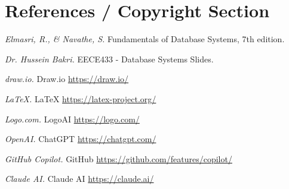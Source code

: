 \section{References / Copyright Section}

\begin{thebibliography}{9}
  \textit{Elmasri, R., \& Navathe, S.} Fundamentals of Database Systems, 7th edition.
  
  \textit{Dr. Hussein Bakri.} EECE433 - Database Systems Slides.
  
  \textit{draw.io.} Draw.io
  \url{https://draw.io/}
  
  \textit{LaTeX.} LaTeX
  \url{https://latex-project.org/}
  
  \textit{Logo.com.} LogoAI
  \url{https://logo.com/}
  
  \textit{OpenAI.} ChatGPT
  \url{https://chatgpt.com/}
  
  \textit{GitHub Copilot.} GitHub
  \url{https://github.com/features/copilot/}
  
  \textit{Claude AI.} Claude AI
  \url{https://claude.ai/}
\end{thebibliography}
